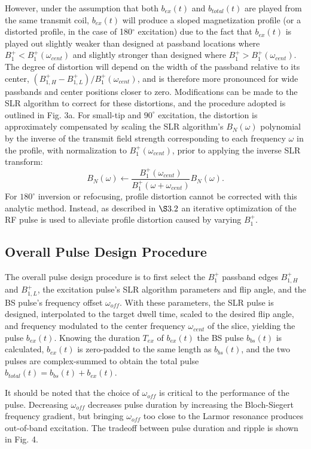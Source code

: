 \documentclass{article}
\newcommand{\bfullt}{b_{total}(t)}
\newcommand{\bext}{b_{ex}(t)}
\begin{document}
\par However, under the assumption that both $\bext$ and $\bfullt$ are played from the same transmit coil, 
 $\bext$ will produce a sloped magnetization profile (or a distorted profile, in the case of 180$^\circ$ excitation) due to the fact that $\bext$ is played out slightly weaker than designed at passband locations where $B_1^+ <  B_1^+(\omega_{cent})$ and slightly stronger than designed where $B_1^+ > B_1^+(\omega_{cent})$. 
The degree of distortion will depend on the width of the passband relative to its center, $(B_{1,H}^+ - B_{1,L}^+) / B_1^+(\omega_{cent})$, and is therefore more pronounced for wide passbands and center positions closer to zero. Modifications can be made to the SLR algorithm to correct for these distortions, and the procedure adopted is outlined in Fig. 3a.
For small-tip and $90^\circ$ excitation, 
the distortion is approximately compensated by scaling the SLR algorithm's $B_N(\omega)$ 
polynomial by the inverse of the transmit field strength corresponding to each frequency $\omega$ in the profile,
with normalization to $B_1^+(\omega_{cent})$, prior to applying the inverse SLR transform:
\begin{equation}
    B_N(\omega) \leftarrow \frac{B_1^+(\omega_{cent})}{B_1^+(\omega + \omega_{cent})}B_N(\omega).
\end{equation}
For $180^\circ$ inversion or refocusing,
profile distortion cannot be corrected with this analytic method. 
Instead, as described in $\S 3.2$ an iterative optimization of the RF pulse is used to alleviate 
profile distortion caused by varying $B_1^+$.

\subsection*{Overall Pulse Design Procedure} 
The overall pulse design procedure is to first select the $B_1^+$ passband edges $B_{1,H}^+$ and $B_{1,L}^+$,
the excitation pulse's SLR algorithm parameters and flip angle, 
and the BS pulse's frequency offset $\omega_{off}$.
With these parameters, the SLR pulse is designed, interpolated to the target dwell time,
scaled to the desired flip angle, and frequency modulated to the center frequency $\omega_{cent}$ of the slice,
yielding the pulse $b_{ex}(t)$.
Knowing the duration $T_{ex}$ of $b_{ex}(t)$
the BS pulse $b_{bs}(t)$ is calculated,
$b_{ex}(t)$ is zero-padded to the same length as $b_{bs}(t)$,
and the two pulses are complex-summed to obtain the total pulse 
$b_{total}(t) = b_{bs}(t) + b_{ex}(t)$.
\par It should be noted that the choice of $\omega_{off}$ is critical to the performance of the pulse. Decreasing $\omega_{off}$ decreases pulse duration by increasing the Bloch-Siegert frequency gradient, but bringing $\omega_{off}$ too close to the Larmor resonance produces out-of-band excitation. The tradeoff between pulse duration and ripple is shown in Fig. 4.
\end{document}
